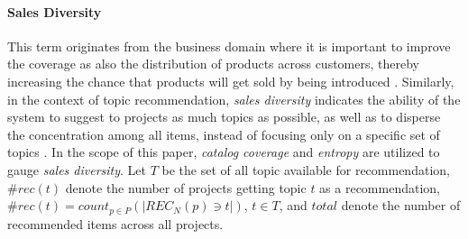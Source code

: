 \paragraph{\textbf{Sales Diversity}} This term originates from the business domain where it is important to 
improve the coverage as also the distribution of products across customers, thereby increasing the 
chance that products will get sold by being introduced 
\cite{Vargas_sales_diversity_14}. Similarly, in the context 
of topic recommendation, \emph{sales diversity} indicates the ability of the system to suggest to 
projects as much topics as possible, as well as to disperse the concentration among all items, 
instead of focusing only on a specific set of topics \cite{Robillard:2014:RSS:2631387}. 
In the scope of this paper, \emph{catalog coverage} and \emph{entropy} are utilized to gauge 
\emph{sales diversity}. Let $T$ be the set of all 
topic available for recommendation, $\#rec(t)$ denote the number of projects getting topic 
$t$ as a recommendation, \ie $\#rec(t)=count_{p \in P}( \left |   REC_{N}(p)  \ni t  \right |  )$, $t \in T $, and $total$ denote the number of recommended items across all projects.
%

